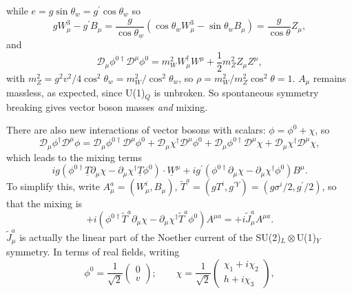 while $e = g \sin\theta_w = g^\prime \cos\theta_w$ so 
\begin{equation}
g W_\mu^3 - g^\prime B_\mu = \frac{g}{\cos \theta_w} (\cos\theta_w W_\mu^3 - \sin\theta_w B_\mu) = \frac{g}{\cos\theta} Z_\mu,
\end{equation}
and
\begin{equation}
\mathcal{D}_\mu \phi^{0 \dagger} \mathcal{D}^\mu \phi^0 = m_W^2 W_\mu^\dagger W^\mu + \frac{1}{2}m_Z^2 Z_\mu Z^\mu,
\end{equation}
with $m_Z^2 = g^2v^2/4\cos^2\theta_w = m_W^2/\cos^2\theta_w$, so $\rho = m_W^2/m_Z^2\cos^2\theta = 1$. $A_\mu$ remains massless, as expected, since U(1)$_Q$ is unbroken. So spontaneous symmetry breaking gives vector boson masses \textit{and} mixing.

There are also new interactions of vector bosons with scalars: $\phi = \phi^0 + \chi$, so
\begin{equation}
\mathcal{D}_\mu \phi^{\dagger} \mathcal{D}^\mu \phi = \mathcal{D}_\mu \phi^{0 \dagger} \mathcal{D}^\mu \phi^0 + \mathcal{D}_\mu \chi^{\dagger} \mathcal{D}^\mu \phi^0 + \mathcal{D}_\mu \phi^{0 \dagger} \mathcal{D}^\mu \chi + \mathcal{D}_\mu \chi^{\dagger} \mathcal{D}^\mu \chi,
\end{equation}
which leads to the mixing terms
\begin{equation}
ig(\phi^{0 \dagger} \underline{T} \partial_\mu \chi -\partial_\mu \chi^\dagger \underline{T} \phi^0) \cdot \underline{W}^\mu + i g^\prime (\phi^{0 \dagger} \partial_\mu \chi - \partial_\mu \chi^\dagger \phi^0) B^\mu.
\end{equation}
To simplify this, write $A_\mu^a = (W_\mu^i, B_\mu)$, $\tilde{T}^a = (gT^i, g^{\prime Y}) = (g\sigma^i/2, g^\prime/2)$, so that the mixing is
\begin{equation}
+i(\phi^{0 \dagger} \tilde{T}^a \partial_\mu \chi - \partial_\mu \chi^\dagger \tilde{T}^a \phi^0)A^{\mu a} = +i \tilde{J}_\mu^a A^{\mu a}.
\end{equation}
$\tilde{J}_\mu^a$ is actually the linear part of the Noether current of the SU(2)$_L \otimes$U(1)$_Y$ symmetry. In terms of real fields, writing 
\[\phi^0 = \frac{1}{\sqrt{2}} \left( \begin{array}{cc}
0 \\
v
\end{array} \right); \qquad
\chi = \frac{1}{\sqrt{2}}
 \left( \begin{array}{cc}
\chi_1 + i \chi_2 \\
h + i \chi_3  \end{array} \right), \]

